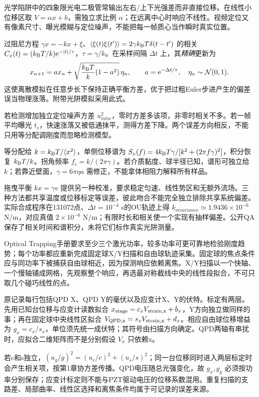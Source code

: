 光学陷阱中的四象限光电二极管常输出左右/上下光强差而非直接位移。在线性小位移区取 $V=\alpha x+b$，需独立求比例 $\alpha$；在远离中心时响应不线性。视频定位又有像素尺寸、曝光模糊与定位噪声，不能把每一帧质心当作瞬时真实位置。

过阻尼方程 $\gamma\dot x=-kx+\xi$、$\langle \xi(t)\xi(t')\rangle=2\gamma k_{\mathrm B} T\delta(t-t')$ 的相关 $C_x(t)=(k_{\mathrm B} T/k)\mathrm e^{-|t|/\tau}$，$\tau=\gamma/k$。在采样间隔 $\Delta t$ 上，其\emph{精确}更新为
\[
x_{n+1}=a x_n+\sqrt{\frac{k_{\mathrm B} T}k(1-a^2)}\,\eta_n,
\qquad a=\mathrm e^{-\Delta t/\tau},\quad\eta_n\sim\mathcal N(0,1).
\]
这使离散模拟在任意步长下保持正确平衡方差，优于把过粗Euler步进产生的偏差误当物理涨落。附带光阱模拟采用此式。

若检测增加独立定位噪声方差 $u_{
m loc}^2$，零时方差多该项，非零时相关不多。若一帧平均曝光 $t_e$，快速涨落又被低通抹平，测得方差下降。两个误差方向相反，不能只用等分配调刚度而忽略检测模型。

等分配给 $k=k_{\mathrm B} T/\langle x^2\rangle$，单侧位移谱为 $S_x(f)=4k_{\mathrm B} T\gamma/[k^2+(2\pi f\gamma)^2]$，积分恢复 $k_{\mathrm B} T/k$。拐角频率 $f_c=k/(2\pi\gamma)$。若介质黏度、球半径已知，谱形可独立给 $k$；若靠近壁面，$\gamma=6\pi\eta a$ 需修正，不能拿体相阻力解释所有样品。

拖曳平衡 $kx=\gamma v$ 提供另一种校准，要求稳定匀速、线性势区和无额外流场。三种方法都共享温度或位移标定等误差，彼此吻合不能完全独立排除共享系统偏差。实际合成程序在131072点、$\Delta t=10^{-4}$ s的OU轨迹上得 $k_{
m variance}\simeq1.9436\times10^{-6}$ N/m，对应真值 $2\times10^{-6}$ N/m；有限时长和相关使一个实现有抽样偏差。公开QA保存了相关时间和谱积分，未将它们标作真实光阱测量。

Optical Trapping手册要求至少三个激光功率，较多功率可更可靠地检验刚度趋势；每个功率都应重新完成固定球X/Y扫描和自由球轨迹采集。固定球的焦点条件应与同功率下被捕获自由球相近，因为探测响应依赖离焦。X/Y扫描以一个快轴、一个慢轴铺成网格，先观察整个响应，再选最对称截线中央的线性段拟合，不可只取几个碰巧线性的点。

原记录每行包括QPD X、QPD Y的毫伏以及应变计X、Y的伏特。标定有两层。先用已知台位移与应变计读数拟合 $x_{\rm stage}=c_x V_{\rm strain,x}+b_x$，Y方向独立做同样的事；再在固定球中央线性区拟合 $V_{\rm QPD,x}=s_xV_{\rm strain,x}+d_x$。相应自由球位移增益为 $g_x=c_x/s_x$，单位须先统一成伏特；其符号由扫描方向确定。QPD两轴有串扰时，应拟合二维矩阵而不是分别假设 $V_x$ 只依赖x。

若c和s独立，$(u_g/g)^2=(u_c/c)^2+(u_s/s)^2$；同一台位移同时进入两层标定时会产生相关项，按第1章协方差传播。QPD电压随总光强变化，故 $g_x,g_y$ 必须按功率分别保存；应变计标定则不能与PZT驱动电压的位移系数混用。重复扫描的支路差、局部曲率、线性区选择和离焦条件均属于可记录的误差来源。

